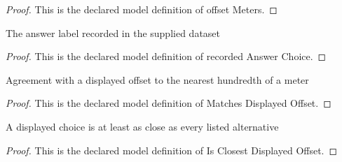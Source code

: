 \begin{proof}
  This is the declared model definition of offset Meters.
\end{proof}
\begin{definition}
  \label{def:physics:phyx-mini-0265:phyxminiproblems-problemphyxmini0265-recordedanswerchoice}
  The answer label recorded in the supplied dataset
\end{definition}
\begin{proof}
  This is the declared model definition of recorded Answer Choice.
\end{proof}
\begin{definition}
  \label{def:physics:phyx-mini-0265:phyxminiproblems-problemphyxmini0265-matchesdisplayedoffset}
  Agreement with a displayed offset to the nearest hundredth of a meter
\end{definition}
\begin{proof}
  This is the declared model definition of Matches Displayed Offset.
\end{proof}
\begin{definition}
  \label{def:physics:phyx-mini-0265:phyxminiproblems-problemphyxmini0265-isclosestdisplayedoffset}
  A displayed choice is at least as close as every listed alternative
\end{definition}
\begin{proof}
  This is the declared model definition of Is Closest Displayed Offset.
\end{proof}
